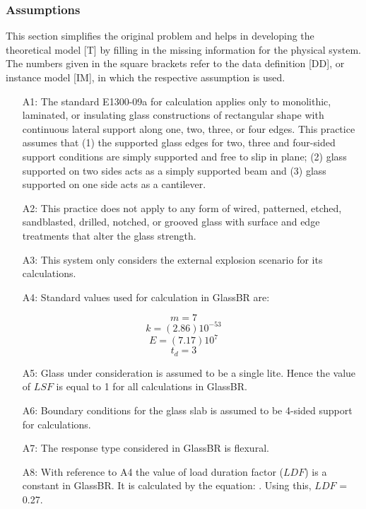 \documentclass[12pt]{article}
\begin{document}
\subsubsection{Assumptions}
\label{Sec:A}
This section simplifies the original problem and helps in developing the theoretical model [T] by filling in the missing information for the physical system. The numbers given in the square brackets refer to the data definition [DD], or instance model [IM], in which the respective assumption is used.
\begin{itemize}
\item[A1:]The standard E1300-09a for calculation applies only to monolithic, laminated, or insulating glass constructions of rectangular shape with continuous lateral support along one, two, three, or four edges. This practice assumes that (1) the supported glass edges for two, three and four-sided support conditions are simply supported and free to slip in plane; (2) glass supported on two sides acts as a simply supported beam and (3) glass supported on one side acts as a cantilever.
\item[A2:]This practice does not apply to any form of wired, patterned, etched, sandblasted, drilled, notched, or grooved glass with surface and edge treatments that alter the glass strength.
\item[A3:]This system only considers the external explosion scenario for its calculations.
\item[A4:]Standard values used for calculation in GlassBR are:
\end{itemize}
\begin{equation}
m=7
\end{equation}
\begin{equation}
k=(2.86)10^{-53}
\end{equation}
\begin{equation}
E=(7.17)10^{7}
\end{equation}
\begin{equation}
t_{d}=3
\end{equation}
\begin{itemize}
\item[A5:]Glass under consideration is assumed to be a single lite. Hence the value of $LSF$ is equal to 1 for all calculations in GlassBR.
\item[A6:]Boundary conditions for the glass slab is assumed to be 4-sided support for calculations.
\item[A7:]The response type considered in GlassBR is flexural.
\item[A8:]With reference to A4 the value of load duration factor ($LDF$) is a constant in GlassBR. It is calculated by the equation: . Using this, $LDF$ = 0.27.
\end{itemize}
\end{document}
